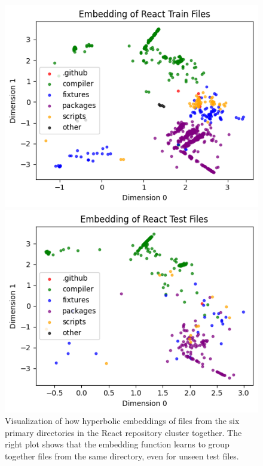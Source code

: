 \documentclass{article}
\begin{document}
\begin{figure}[ht]
  \begin{minipage}{0.5\textwidth}
    \centering
    \includegraphics[width=\linewidth]{figures/react_train.png}
  \end{minipage}%
  \begin{minipage}{0.5\textwidth}
    \centering
    \includegraphics[width=\linewidth]{figures/react_test.png}
  \end{minipage}
  \caption{Visualization of how hyperbolic embeddings of files from the six primary directories in the React repository cluster together. The right plot shows that the embedding function learns to group together files from the same directory, even for unseen test files.}
  \label{fig:React-training-and-test-embeddings}
\end{figure}
\end{document}

